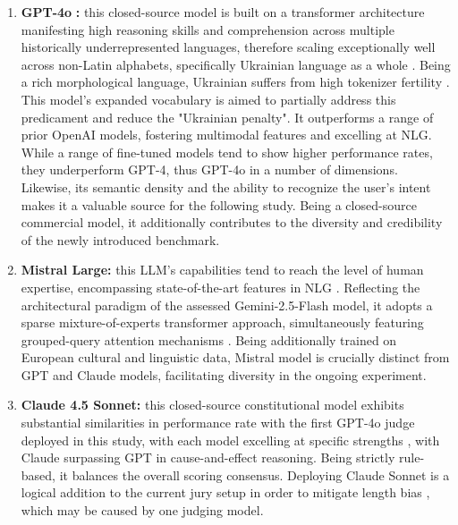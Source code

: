 \documentclass[10pt, twocolumn]{article}
\begin{document}
\begin{enumerate}
    \item \textbf{GPT-4o} \cite{openai2024gpt4ocard, openai2024gpt4technicalreport}\textbf{:} this closed-source model is built on a transformer architecture \cite{vaswani2017attention} manifesting high reasoning skills and comprehension across multiple historically underrepresented languages, therefore scaling exceptionally well across non-Latin alphabets, specifically Ukrainian language as a whole \cite {houamegni2025evaluatingeffectivenesslargelanguage}. Being a rich morphological language, Ukrainian suffers from high tokenizer fertility \cite{ovcharov2026tokenizertax25european}. This model's expanded vocabulary is aimed to partially address this predicament and reduce the "Ukrainian penalty". It outperforms a range of prior OpenAI models, fostering multimodal features and excelling at NLG. While a range of fine-tuned models tend to show higher performance rates, they underperform GPT-4, thus GPT-4o in a number of dimensions\cite{huang2025empiricalstudyllmasajudgellm}. Likewise, its semantic density and the ability to recognize the user's intent makes it a valuable source for the following study. Being a closed-source commercial model, it additionally contributes to the diversity and credibility of the newly introduced benchmark. 
    
    \item \textbf{Mistral Large:} this LLM's capabilities tend to reach the level of human expertise, encompassing state-of-the-art features in NLG \cite {tsai2024comparative}. Reflecting the architectural paradigm of the assessed Gemini-2.5-Flash model, it adopts a sparse mixture-of-experts \cite{bandarkar2026multilingualroutingmixtureofexperts} transformer \cite{vaswani2017attention} approach, simultaneously featuring grouped-query attention mechanisms \cite{jiang2023mistral7b}. Being additionally trained on European cultural and linguistic data, Mistral model is crucially distinct from GPT and Claude models, facilitating diversity in the ongoing experiment. 
    
    \item \textbf{Claude 4.5 Sonnet:} this closed-source constitutional model exhibits substantial similarities in performance rate with the first GPT-4o judge deployed in this study, with each model excelling at specific strengths \cite{huang2024olympicarenamedalranksintelligent}, with Claude surpassing GPT in cause-and-effect reasoning. Being strictly rule-based, it balances the overall scoring consensus. Deploying Claude Sonnet is a logical addition to the current jury setup in order to mitigate length bias \cite{chen2026benchmarkingllmasajudgelongformoutput}, which may be caused by one judging model.
\end{enumerate}
\end{document}
